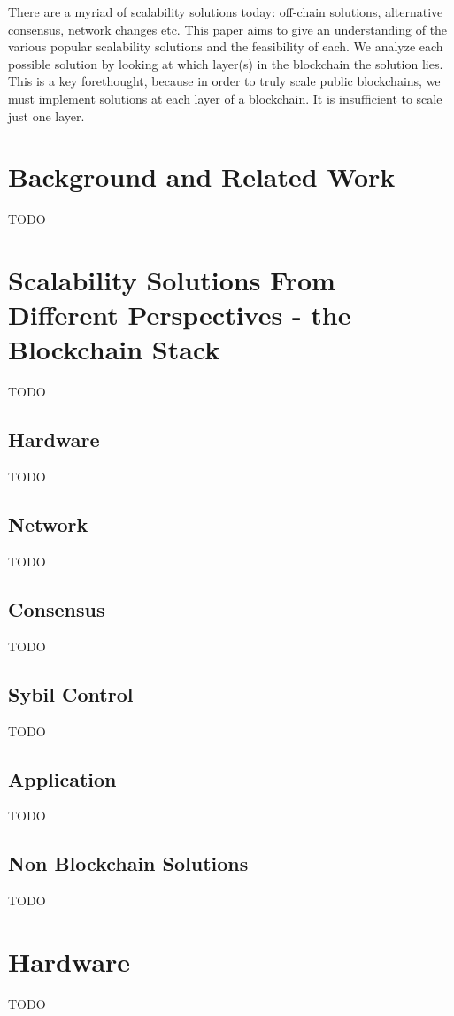 \documentclass{article}
\begin{document}
There are a myriad of scalability solutions today: off-chain solutions, alternative consensus, network changes etc. This paper aims to give an understanding of the various popular scalability solutions and the feasibility of each. We analyze each possible solution by looking at which layer(s) in the blockchain the solution lies. This is a key forethought, because in order to truly scale public blockchains, we must implement solutions at each layer of a blockchain. It is insufficient to scale just one layer.



\section{Background and Related Work}
TODO

\section{Scalability Solutions From Different Perspectives - the Blockchain Stack}
TODO

\subsection{Hardware}
TODO

\subsection{Network}
TODO

\subsection{Consensus}
TODO

\subsection{Sybil Control}
TODO

\subsection{Application}
TODO

\subsection{Non Blockchain Solutions}
TODO

\section{Hardware}
TODO
\end{document}
